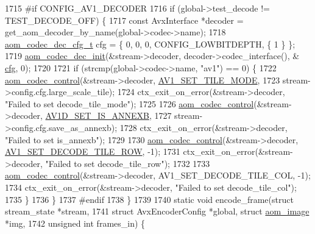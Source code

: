\begin{DoxyCodeInclude}
{{{{{{{{{{{{{{{{{{{{{{{{{{{{{{{1715 \textcolor{preprocessor}{#if CONFIG\_AV1\_DECODER}
1716   \textcolor{keywordflow}{if} (global->test\_decode != TEST\_DECODE\_OFF) \{
1717     \textcolor{keyword}{const} AvxInterface *decoder = get\_aom\_decoder\_by\_name(global->codec->name);
1718     \hyperlink{structaom__codec__dec__cfg}{aom\_codec\_dec\_cfg\_t} cfg = \{ 0, 0, 0, CONFIG\_LOWBITDEPTH, \{ 1 \} \};
1719     \hyperlink{group__decoder_gafdbfca65b19ab1f6d72b32cd01753b9b}{aom\_codec\_dec\_init}(&stream->decoder, decoder->codec\_interface(), &
      \hyperlink{structaom__codec__enc__cfg_a91c4b8e91211a9cea98a8003ef2e4e65}{cfg}, 0);
1720 
1721     \textcolor{keywordflow}{if} (strcmp(global->codec->name, \textcolor{stringliteral}{"av1"}) == 0) \{
1722       \hyperlink{group__codec_ga6da974f4eeaba1fa74106b28d0fe6ac5}{aom\_codec\_control}(&stream->decoder, \hyperlink{group__aom__decoder_gga3865fd4b3192489baa9a5c3632ebe97ba0795d8084ae8c78528c01587198df9e2}{AV1\_SET\_TILE\_MODE},
1723                         stream->config.cfg.large\_scale\_tile);
1724       ctx\_exit\_on\_error(&stream->decoder, \textcolor{stringliteral}{"Failed to set decode\_tile\_mode"});
1725 
1726       \hyperlink{group__codec_ga6da974f4eeaba1fa74106b28d0fe6ac5}{aom\_codec\_control}(&stream->decoder, \hyperlink{group__aom__decoder_gga3865fd4b3192489baa9a5c3632ebe97ba1fb269c5c5913d9995b6c35d28e2a788}{AV1D\_SET\_IS\_ANNEXB},
1727                         stream->config.cfg.save\_as\_annexb);
1728       ctx\_exit\_on\_error(&stream->decoder, \textcolor{stringliteral}{"Failed to set is\_annexb"});
1729 
1730       \hyperlink{group__codec_ga6da974f4eeaba1fa74106b28d0fe6ac5}{aom\_codec\_control}(&stream->decoder, 
      \hyperlink{group__aom__decoder_gga3865fd4b3192489baa9a5c3632ebe97bac056b4cf80427fd05e3c4c9fc46edb78}{AV1\_SET\_DECODE\_TILE\_ROW}, -1);
1731       ctx\_exit\_on\_error(&stream->decoder, \textcolor{stringliteral}{"Failed to set decode\_tile\_row"});
1732 
1733       \hyperlink{group__codec_ga6da974f4eeaba1fa74106b28d0fe6ac5}{aom\_codec\_control}(&stream->decoder, AV1\_SET\_DECODE\_TILE\_COL, -1);
1734       ctx\_exit\_on\_error(&stream->decoder, \textcolor{stringliteral}{"Failed to set decode\_tile\_col"});
1735     \}
1736   \}
1737 \textcolor{preprocessor}{#endif}
1738 \}
1739 
1740 \textcolor{keyword}{static} \textcolor{keywordtype}{void} encode\_frame(\textcolor{keyword}{struct} stream\_state *stream,
1741                          \textcolor{keyword}{struct} AvxEncoderConfig *global, \textcolor{keyword}{struct} \hyperlink{structaom__image}{aom\_image} *img,
1742                          \textcolor{keywordtype}{unsigned} \textcolor{keywordtype}{int} frames\_in) \{
}}}}}}}}}}}}}}}}}}}}}}}}}}}}}}}
\end{DoxyCodeInclude}
